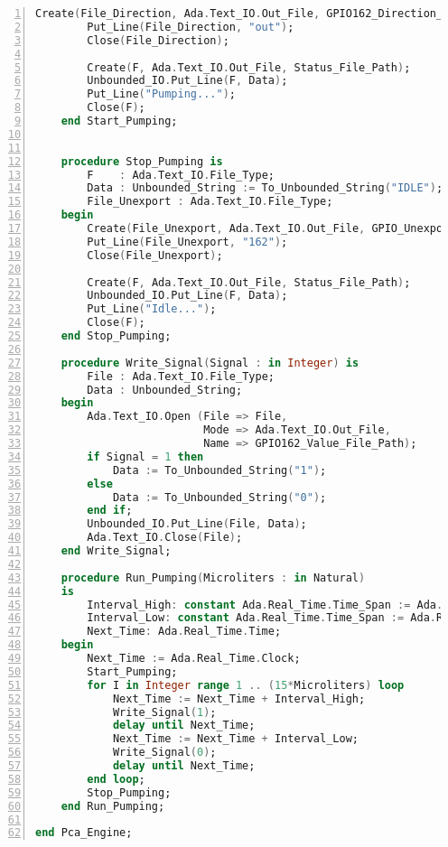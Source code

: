\begin{lstlisting}[language=ada, gobble=0, numbers=left, caption={\lstinline{Pca_Engine} package}, label={listing:pca_ravenscar:pca_engine}]
        Create(File_Direction, Ada.Text_IO.Out_File, GPIO162_Direction_File_Path);
        Put_Line(File_Direction, "out");
        Close(File_Direction);

        Create(F, Ada.Text_IO.Out_File, Status_File_Path);
        Unbounded_IO.Put_Line(F, Data);
        Put_Line("Pumping...");
        Close(F);
    end Start_Pumping;


    procedure Stop_Pumping is
        F    : Ada.Text_IO.File_Type;
        Data : Unbounded_String := To_Unbounded_String("IDLE");
        File_Unexport : Ada.Text_IO.File_Type;
    begin
        Create(File_Unexport, Ada.Text_IO.Out_File, GPIO_Unexport_File_Path);
        Put_Line(File_Unexport, "162");
        Close(File_Unexport);

        Create(F, Ada.Text_IO.Out_File, Status_File_Path);
        Unbounded_IO.Put_Line(F, Data);
        Put_Line("Idle...");
        Close(F);
    end Stop_Pumping;

    procedure Write_Signal(Signal : in Integer) is
        File : Ada.Text_IO.File_Type;
        Data : Unbounded_String;
    begin
        Ada.Text_IO.Open (File => File,
                          Mode => Ada.Text_IO.Out_File,
                          Name => GPIO162_Value_File_Path);
        if Signal = 1 then
            Data := To_Unbounded_String("1");
        else
            Data := To_Unbounded_String("0");
        end if;
        Unbounded_IO.Put_Line(File, Data);
        Ada.Text_IO.Close(File);
    end Write_Signal;

    procedure Run_Pumping(Microliters : in Natural)
    is
        Interval_High: constant Ada.Real_Time.Time_Span := Ada.Real_Time.Microseconds(9000);
        Interval_Low: constant Ada.Real_Time.Time_Span := Ada.Real_Time.Microseconds(1000);
        Next_Time: Ada.Real_Time.Time;
    begin
        Next_Time := Ada.Real_Time.Clock;
        Start_Pumping;
        for I in Integer range 1 .. (15*Microliters) loop
            Next_Time := Next_Time + Interval_High;
            Write_Signal(1);
            delay until Next_Time;
            Next_Time := Next_Time + Interval_Low;
            Write_Signal(0);
            delay until Next_Time;
        end loop;
        Stop_Pumping;
    end Run_Pumping;

end Pca_Engine;
\end{lstlisting} 
\doublespacing

